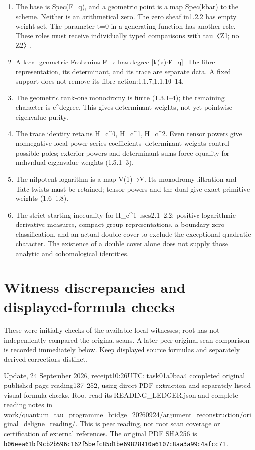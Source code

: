 \documentclass[
]{report}
\providecommand{\tightlist}{%
  \setlength{\itemsep}{0pt}\setlength{\parskip}{0pt}}
\begin{document}
\begin{enumerate}
\def\labelenumi{\arabic{enumi}.}
\tightlist
\item
  The base is Spec(F\_q), and a geometric point is a map Spec(kbar) to
  the scheme. Neither is an arithmetical zero. The zero sheaf in1.2.2
  has empty weight set. The parameter t=0 in a generating function has
  another role. These roles must receive individually typed comparisons
  with tau〈Z1; no Z2〉.
\item
  A local geometric Frobenius F\_x has degree {[}k(x):F\_q{]}. The fibre
  representation, its determinant, and its trace are separate data. A
  fixed support does not remove its fibre action:1.1.7,1.1.10--14.
\item
  The geometric rank-one monodromy is finite (1.3.1--4); the remaining
  character is c\^{}degree. This gives determinant weights, not yet
  pointwise eigenvalue purity.
\item
  The trace identity retains H\_c\^{}0, H\_c\^{}1, H\_c\^{}2. Even
  tensor powers give nonnegative local power-series coefficients;
  determinant weights control possible poles; exterior powers and
  determinant sums force equality for individual eigenvalue weights
  (1.5.1--3).
\item
  The nilpotent logarithm is a map V(1)→V. Its monodromy filtration and
  Tate twists must be retained; tensor powers and the dual give exact
  primitive weights (1.6--1.8).
\item
  The strict starting inequality for H\_c\^{}1 uses2.1--2.2: positive
  logarithmic-derivative measures, compact-group representations, a
  boundary-zero classification, and an actual double cover to exclude
  the exceptional quadratic character. The existence of a double cover
  alone does not supply those analytic and cohomological identities.
\end{enumerate}

\section{Witness discrepancies and displayed-formula
checks}\label{witness-discrepancies-and-displayed-formula-checks}

These were initially checks of the available local witnesses; root has
not independently compared the original scans. A later peer
original-scan comparison is recorded immediately below. Keep displayed
source formulas and separately derived corrections distinct.

Update, 24 September 2026, receipt10:26UTC: task01a0baa4 completed
original published-page reading137--252, using direct PDF extraction and
separately listed visual formula checks. Root read its
READING\_LEDGER.json and complete-reading notes in
work/quantum\_tau\_programme\_bridge\_20260924/argument\_reconstruction/original\_deligne\_reading/.
This is peer reading, not root scan coverage or certification of
external references. The original PDF SHA256 is
\nolinkurl{b06eea61bf9cb2b596c162f5befc85d1be69828910a6107c8aa3a99c4afcc71.}
\end{document}
